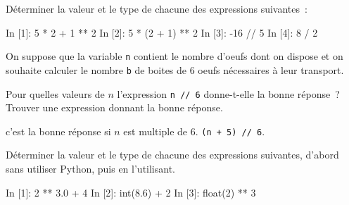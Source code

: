 \documentclass{magnolia}
\begin{document}


Déterminer la valeur et le type de chacune des expressions suivantes~:
\begin{pythoncode}
In [1]: 5 * 2 + 1 ** 2
In [2]: 5 * (2 + 1) ** 2
In [3]: -16 // 5
In [4]: 8 / 2
\end{pythoncode}

On suppose que la variable \verb_n_ contient le nombre d'oeufs dont on dispose et on souhaite
calculer le nombre \verb_b_ de boites de 6 oeufs nécessaires à leur transport.
\begin{questions}
\question Pour quelles valeurs de $n$ l'expression \verb_n // 6_ donne-t-elle la bonne
  réponse~?
\question Trouver une expression donnant la bonne réponse.
\end{questions}
\begin{sol}
\begin{questions}
\question c'est la bonne réponse si $n$ est multiple de 6.
\question \verb_(n + 5) // 6_.
\end{questions}
\end{sol}



Déterminer la valeur et le type de chacune des expressions suivantes, d'abord sans utiliser
Python, puis en l'utilisant.
\begin{pythoncode}
In [1]: 2 ** 3.0 + 4
In [2]: int(8.6) + 2
In [3]: float(2) ** 3
\end{pythoncode}

\end{document}
